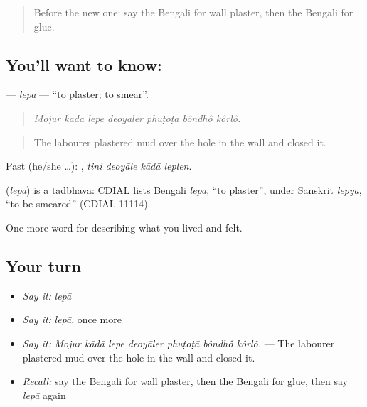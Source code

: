 \begin{quote}
Before the new one: say the Bengali for wall plaster, then the Bengali for glue.
\end{quote}

\subsection*{You'll want to know: }
\textbf{} — \emph{lepā} — \textquotedblleft{}to plaster; to smear\textquotedblright{}.

\begin{quote}
      
\end{quote}

\begin{quote}
\emph{Mojur kādā lepe deoyāler phuṭoṭā bôndhô kôrlô.}
\end{quote}

\begin{quote}
The labourer plastered mud over the hole in the wall and closed it.
\end{quote}

Past (he/she …):    , \emph{tini deoyāle kādā leplen}.

\begin{cousinweb}
\textbf{} (\emph{lepā}) is a tadbhava: CDIAL lists Bengali \emph{lepā}, \textquotedblleft{}to plaster\textquotedblright{}, under Sanskrit \emph{lepya}, \textquotedblleft{}to be smeared\textquotedblright{} (CDIAL 11114).
\end{cousinweb}

\begin{grammarlens}[title={What you've built}]
One more word for describing what you lived and felt.
\end{grammarlens}

\subsection*{Your turn}
\begin{itemize}
\raggedright
  \item \emph{Say it:} \emph{lepā}
  \item \emph{Say it:} \emph{lepā}, once more
  \item \emph{Say it:} \emph{Mojur kādā lepe deoyāler phuṭoṭā bôndhô kôrlô.} — The labourer plastered mud over the hole in the wall and closed it.
  \item \emph{Recall:} say the Bengali for wall plaster, then the Bengali for glue, then say \emph{lepā} again
\end{itemize}

